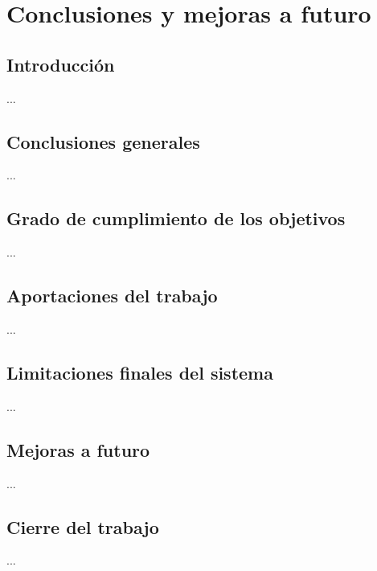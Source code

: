 \chapter{Conclusiones y mejoras a futuro}
\label{cap:capitulo10}

\vspace{0.25cm}

\section{Introducción}
\label{sec:segundaseccion}

...

\section{Conclusiones generales}
\label{sec:segundaseccion}

...

\section{Grado de cumplimiento de los objetivos}
\label{sec:segundaseccion}

...

\section{Aportaciones del trabajo}
\label{sec:segundaseccion}

...

\section{Limitaciones finales del sistema}
\label{sec:segundaseccion}

...

\section{Mejoras a futuro}
\label{sec:segundaseccion}

...

\section{Cierre del trabajo}
\label{sec:segundaseccion}

...
